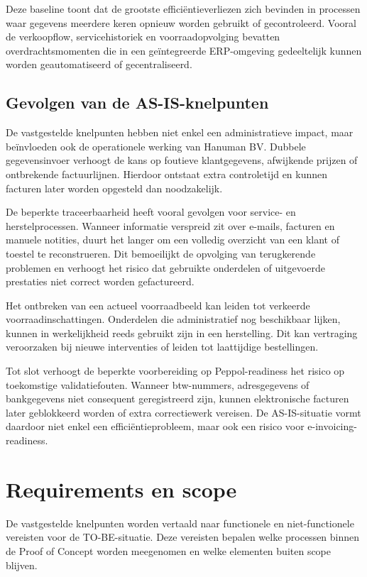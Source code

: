 Deze baseline toont dat de grootste efficiëntieverliezen zich bevinden in processen waar gegevens meerdere keren opnieuw worden gebruikt of gecontroleerd. Vooral de verkoopflow, servicehistoriek en voorraadopvolging bevatten overdrachtsmomenten die in een geïntegreerde ERP-omgeving gedeeltelijk kunnen worden geautomatiseerd of gecentraliseerd.

\subsection{Gevolgen van de AS-IS-knelpunten}

De vastgestelde knelpunten hebben niet enkel een administratieve impact, maar beïnvloeden ook de operationele werking van Hanuman BV. Dubbele gegevensinvoer verhoogt de kans op foutieve klantgegevens, afwijkende prijzen of ontbrekende factuurlijnen. Hierdoor ontstaat extra controletijd en kunnen facturen later worden opgesteld dan noodzakelijk.

De beperkte traceerbaarheid heeft vooral gevolgen voor service- en herstelprocessen. Wanneer informatie verspreid zit over e-mails, facturen en manuele notities, duurt het langer om een volledig overzicht van een klant of toestel te reconstrueren. Dit bemoeilijkt de opvolging van terugkerende problemen en verhoogt het risico dat gebruikte onderdelen of uitgevoerde prestaties niet correct worden gefactureerd.

Het ontbreken van een actueel voorraadbeeld kan leiden tot verkeerde voorraadinschattingen. Onderdelen die administratief nog beschikbaar lijken, kunnen in werkelijkheid reeds gebruikt zijn in een herstelling. Dit kan vertraging veroorzaken bij nieuwe interventies of leiden tot laattijdige bestellingen.

Tot slot verhoogt de beperkte voorbereiding op Peppol-readiness het risico op toekomstige validatiefouten. Wanneer btw-nummers, adresgegevens of bankgegevens niet consequent geregistreerd zijn, kunnen elektronische facturen later geblokkeerd worden of extra correctiewerk vereisen. De AS-IS-situatie vormt daardoor niet enkel een efficiëntieprobleem, maar ook een risico voor e-invoicing-readiness.

\section{Requirements en scope}
\label{sec:requirements-scope}

De vastgestelde knelpunten worden vertaald naar functionele en niet-functionele vereisten voor de TO-BE-situatie. Deze vereisten bepalen welke processen binnen de Proof of Concept worden meegenomen en welke elementen buiten scope blijven.

